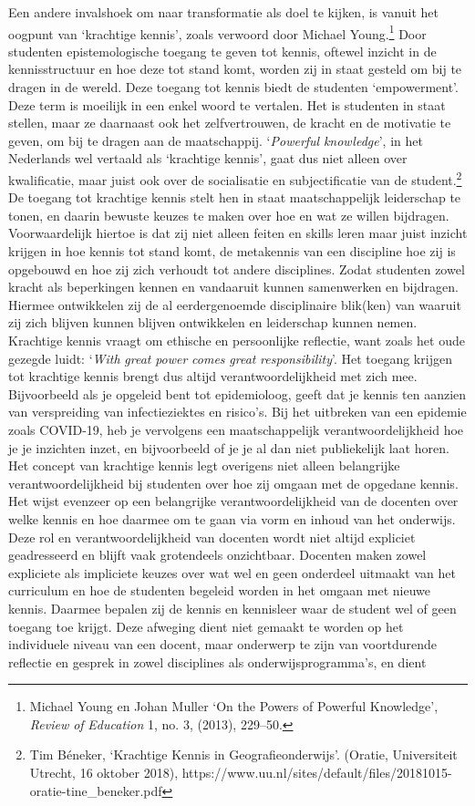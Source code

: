 \documentclass[smallauthor, chapterhaspagenum, nochapterinheader, pagenuminheader,  bigchapnum,medium2, tocpages,  garamond, titleinheader]{jote-book}
\begin{document}
	Een andere invalshoek om naar transformatie als doel te kijken, is vanuit het oogpunt van ‘krachtige kennis', zoals verwoord door Michael Young.\footnote{Michael Young en Johan Muller ‘On the Powers of Powerful Knowledge', \emph{Review of }\emph{Education} 1, no. 3, (2013), 229--50.} Door studenten epistemologische toegang te geven tot kennis, oftewel inzicht in de kennisstructuur en hoe deze tot stand komt, worden zij in staat gesteld om bij te dragen in de wereld. Deze toegang tot kennis biedt de studenten ‘empowerment'. Deze term is moeilijk in een enkel woord te vertalen. Het is studenten in staat stellen, maar ze daarnaast ook het zelfvertrouwen, de kracht en de motivatie te geven, om bij te dragen aan de maatschappij. ‘\emph{Powerful}\emph{ }\emph{knowledge}', in het Nederlands wel vertaald als ‘krachtige kennis', gaat dus niet alleen over kwalificatie, maar juist ook over de socialisatie en subjectificatie van de student.\footnote{Tim Béneker, ‘Krachtige Kennis in Geografieonderwijs'. (Oratie, Universiteit Utrecht, 16 oktober 2018), https://www.uu.nl/sites/default/files/20181015-oratie-tine\_beneker.pdf} De toegang tot krachtige kennis stelt hen in staat maatschappelijk leiderschap te tonen, en daarin bewuste keuzes te maken over hoe en wat ze willen bijdragen. Voorwaardelijk hiertoe is dat zij niet alleen feiten en skills leren maar juist inzicht krijgen in hoe kennis tot stand komt, de metakennis van een discipline hoe zij is opgebouwd en hoe zij zich verhoudt tot andere disciplines. Zodat studenten zowel kracht als beperkingen kennen en vandaaruit kunnen samenwerken en bijdragen. Hiermee ontwikkelen zij de al eerdergenoemde disciplinaire blik(ken) van waaruit zij zich blijven kunnen blijven ontwikkelen en leiderschap kunnen nemen. Krachtige kennis vraagt om ethische en persoonlijke reflectie, want zoals het oude gezegde luidt: ‘\emph{With}\emph{ }\emph{great}\emph{ power }\emph{comes}\emph{ }\emph{great}\emph{ }\emph{responsibility}'. Het toegang krijgen tot krachtige kennis brengt dus altijd verantwoordelijkheid met zich mee. Bijvoorbeeld als je opgeleid bent tot epidemioloog, geeft dat je kennis ten aanzien van verspreiding van infectieziektes en risico's. Bij het uitbreken van een epidemie zoals COVID-19, heb je vervolgens een maatschappelijk verantwoordelijkheid hoe je je inzichten inzet, en bijvoorbeeld of je je al dan niet publiekelijk laat horen. Het concept van krachtige kennis legt overigens niet alleen belangrijke verantwoordelijkheid bij studenten over hoe zij omgaan met de opgedane kennis. Het wijst evenzeer op een belangrijke verantwoordelijkheid van de docenten over welke kennis en hoe daarmee om te gaan via vorm en inhoud van het onderwijs. Deze rol en verantwoordelijkheid van docenten wordt niet altijd expliciet geadresseerd en blijft vaak grotendeels onzichtbaar. Docenten maken zowel expliciete als impliciete keuzes over wat wel en geen onderdeel uitmaakt van het curriculum en hoe de studenten begeleid worden in het omgaan met nieuwe kennis. Daarmee bepalen zij de kennis en kennisleer waar de student wel of geen toegang toe krijgt. Deze afweging dient niet gemaakt te worden op het individuele niveau van een docent, maar onderwerp te zijn van voortdurende reflectie en gesprek in zowel disciplines als onderwijsprogramma's, en dient 
\end{document}

